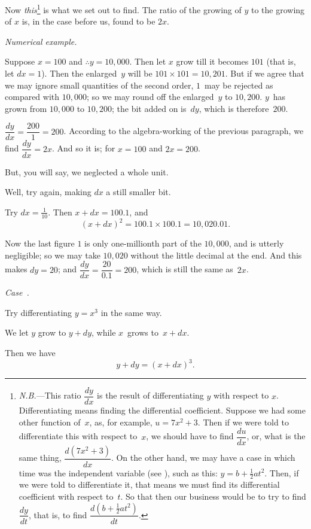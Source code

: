 \documentclass[12pt]{book}[2005/09/16]
\newcommand\Subsection[1]{%
  \medskip\pagebreak[1]\par\textit{#1}\pagebreak[0]\par%
}
\newcommand{\Case}[1]{\Subsection{Case~\upshape{#1}.}}
\newcommand{\DPPageSep}[2]{\Pagelabel{#2}}
\newcommand{\Pagelabel}[1]
  {\phantomsection\label{#1}}
\newcommand{\Pageref}[2][p.]{%
  \ifthenelse{\not\equal{#1}{}}{%
    \hyperref[#2]{#1~\pageref{#2}}%
  }{%
    \hyperref[#2]{\pageref{#2}}%
  }%
}
\newcommand{\NB}{\textit{N.B.}}
\begin{document}
Now \emph{this}\footnote
  {\NB---This ratio $\dfrac{dy}{dx}$ is the result of differentiating $y$ with
  respect to $x$. Differentiating means finding the differential coefficient.
  Suppose we had some other function of~$x$, as, for
  example, $u = 7x^2 + 3$. Then if we were told to differentiate this
  with respect to~$x$, we should have to find $\dfrac{du}{dx}$, or, what is the same
  thing, $\dfrac{d(7x^2 + 3)}{dx}$. On the other hand, we may have a case in which
  time was the independent variable (see \Pageref{indvar}), such as this:
  $y = b + \frac{1}{2} at^2$. Then, if we were told to differentiate it, that means we
  must find its differential coefficient with respect to~$t$. So that then
  our business would be to try to find $\dfrac{dy}{dt}$, that is, to find
  $\dfrac{d(b + \frac{1}{2} at^2)}{dt}$.}
is what we set out to find. The ratio of
the growing of $y$ to the growing of $x$ is, in the case
before us, found to be $2x$.
\DPPageSep{032.png}{20}%


\Subsection{Numerical example.}
Suppose $x=100$ and $\therefore y=10,000$. Then let $x$ grow
till it becomes $101$ (that is, let $dx=1$). Then the
enlarged~$y$ will be $101 × 101 = 10,201$. But if we agree
that we may ignore small quantities of the second
order, $1$~may be rejected as compared with $10,000$; so
we may round off the enlarged~$y$ to $10,200$. $y$~has
grown from $10,000$ to $10,200$; the bit added on is~$dy$,
which is therefore~$200$.

$\dfrac{dy}{dx} = \dfrac{200}{1} = 200$. According to the algebra-working
of the previous paragraph, we find $\dfrac{dy}{dx} = 2x$. And so
it is; for $x=100$ and $2x=200$.

But, you will say, we neglected a whole unit.

Well, try again, making $dx$ a still smaller bit.

Try $dx=\frac{1}{10}$. Then $x+dx=100.1$, and
\[
(x+dx)^2 = 100.1 × 100.1 = 10,020.01.
\]

Now the last figure $1$ is only one-millionth part of
the $10,000$, and is utterly negligible; so we may
take $10,020$ without the little decimal at the end.
And this makes $dy=20$; and $\dfrac{dy}{dx} = \dfrac{20}{0.1} = 200$, which
is still the same as~$2x$.

\Case{2}
Try differentiating $y = x^3$ in the same way.

We let $y$ grow to $y+dy$, while $x$~grows to~$x+dx$.

Then we have
\[
y + dy = (x + dx)^3.
\]
\DPPageSep{033.png}{21}%
\end{document}
